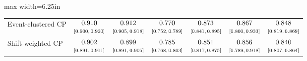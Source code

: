 \begin{table}[htbp]
\begin{adjustbox}{max width=6.25in}
\begin{tabular}{lcccccc}
Event-clustered CP & $\begin{array}{@{}c@{}}0.910\\[-1pt] \scriptstyle[0.900,\,0.920]\end{array}$ & $\begin{array}{@{}c@{}}0.912\\[-1pt] \scriptstyle[0.905,\,0.918]\end{array}$ & $\begin{array}{@{}c@{}}0.770\\[-1pt] \scriptstyle[0.752,\,0.789]\end{array}$ & $\begin{array}{@{}c@{}}0.873\\[-1pt] \scriptstyle[0.841,\,0.895]\end{array}$ & $\begin{array}{@{}c@{}}0.867\\[-1pt] \scriptstyle[0.800,\,0.933]\end{array}$ & $\begin{array}{@{}c@{}}0.848\\[-1pt] \scriptstyle[0.819,\,0.869]\end{array}$ \\
Shift-weighted CP & $\begin{array}{@{}c@{}}0.902\\[-1pt] \scriptstyle[0.891,\,0.911]\end{array}$ & $\begin{array}{@{}c@{}}0.899\\[-1pt] \scriptstyle[0.891,\,0.905]\end{array}$ & $\begin{array}{@{}c@{}}0.785\\[-1pt] \scriptstyle[0.768,\,0.803]\end{array}$ & $\begin{array}{@{}c@{}}0.851\\[-1pt] \scriptstyle[0.817,\,0.875]\end{array}$ & $\begin{array}{@{}c@{}}0.856\\[-1pt] \scriptstyle[0.789,\,0.918]\end{array}$ & $\begin{array}{@{}c@{}}0.840\\[-1pt] \scriptstyle[0.807,\,0.864]\end{array}$ \\

\end{tabular}
\end{adjustbox}
\end{table}
